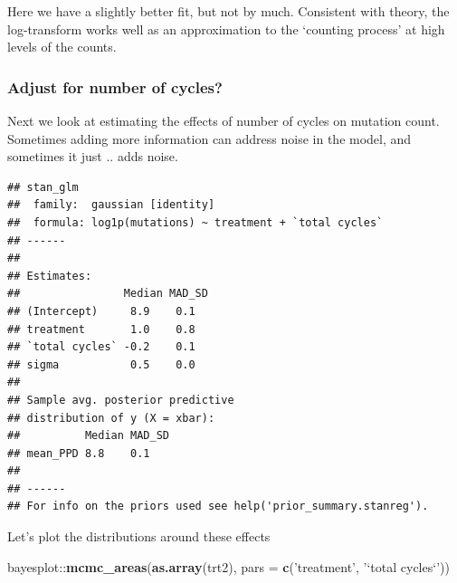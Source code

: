 \documentclass[]{article}
\newenvironment{Shaded}{\begin{snugshade}}{\end{snugshade}}
\newcommand{\KeywordTok}[1]{\textcolor[rgb]{0.13,0.29,0.53}{\textbf{{#1}}}}
\newcommand{\DataTypeTok}[1]{\textcolor[rgb]{0.13,0.29,0.53}{{#1}}}
\newcommand{\DecValTok}[1]{\textcolor[rgb]{0.00,0.00,0.81}{{#1}}}
\newcommand{\StringTok}[1]{\textcolor[rgb]{0.31,0.60,0.02}{{#1}}}
\newcommand{\NormalTok}[1]{{#1}}
\begin{document}
Here we have a slightly better fit, but not by much. Consistent with
theory, the log-transform works well as an approximation to the
`counting process' at high levels of the counts.

\subsubsection{Adjust for number of
cycles?}\label{adjust-for-number-of-cycles}

Next we look at estimating the effects of number of cycles on mutation
count. Sometimes adding more information can address noise in the model,
and sometimes it just .. adds noise.

\begin{Shaded}
\end{Shaded}

\begin{verbatim}
## stan_glm
##  family:  gaussian [identity]
##  formula: log1p(mutations) ~ treatment + `total cycles`
## ------
## 
## Estimates:
##                Median MAD_SD
## (Intercept)     8.9    0.1  
## treatment       1.0    0.8  
## `total cycles` -0.2    0.1  
## sigma           0.5    0.0  
## 
## Sample avg. posterior predictive 
## distribution of y (X = xbar):
##          Median MAD_SD
## mean_PPD 8.8    0.1   
## 
## ------
## For info on the priors used see help('prior_summary.stanreg').
\end{verbatim}

Let's plot the distributions around these effects

\begin{Shaded}
\begin{Highlighting}[]
\NormalTok{bayesplot::}\KeywordTok{mcmc_areas}\NormalTok{(}\KeywordTok{as.array}\NormalTok{(trt2), }\DataTypeTok{pars =} \KeywordTok{c}\NormalTok{(}\StringTok{'treatment'}\NormalTok{, }\StringTok{'`total cycles`'}\NormalTok{))}
\end{Highlighting}
\end{Shaded}
\end{document}

